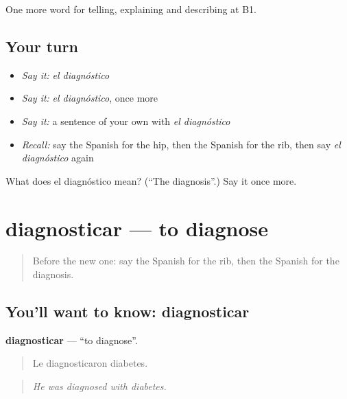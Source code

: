\begin{grammarlens}[title={What you've built}]
One more word for telling, explaining and describing at B1.
\end{grammarlens}

\subsection*{Your turn}
\begin{itemize}
\raggedright
  \item \emph{Say it:} \emph{el diagnóstico}
  \item \emph{Say it:} \emph{el diagnóstico}, once more
  \item \emph{Say it:} a sentence of your own with \emph{el diagnóstico}
  \item \emph{Recall:} say the Spanish for the hip, then the Spanish for the rib, then say \emph{el diagnóstico} again
\end{itemize}

\begin{tcolorbox}[breakable,colback=teal!4,colframe=teal!35!black,title={Before you move on}]
What does el diagnóstico mean? (\textquotedblleft{}The diagnosis\textquotedblright{}.) Say it once more.
\end{tcolorbox}
\section[diagnosticar]{diagnosticar — to diagnose}

\label{lesson:ES-C738-diagnosticar}



\begin{quote}
Before the new one: say the Spanish for the rib, then the Spanish for the diagnosis.
\end{quote}

\subsection*{You'll want to know: diagnosticar}
\textbf{diagnosticar} — \textquotedblleft{}to diagnose\textquotedblright{}.

\begin{quote}
Le diagnosticaron diabetes.
\end{quote}

\begin{quote}
\emph{He was diagnosed with diabetes.}
\end{quote}

